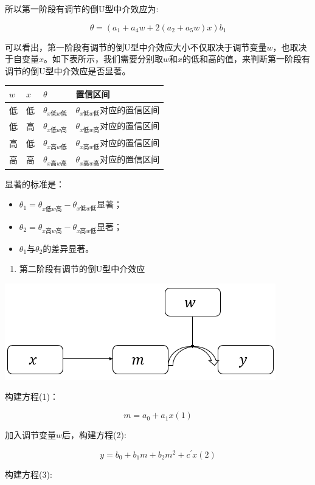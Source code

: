 \documentclass[
]{book}
\providecommand{\tightlist}{%
  \setlength{\itemsep}{0pt}\setlength{\parskip}{0pt}}
\begin{document}
所以第一阶段有调节的倒U型中介效应为:

\[
\theta=(a_{1}+a_{4}w+2(a_{2}+a_{5}w)x)b_{1}
\]

可以看出，第一阶段有调节的倒U型中介效应大小不仅取决于调节变量\(w\)，也取决于自变量\(x\)。如下表所示，我们需要分别取\(w\)和\(x\)的低和高的值，来判断第一阶段有调节的倒U型中介效应是否显著。

\begin{longtable}[]{@{}llll@{}}
\toprule
\(w\) & \(x\) & \(\theta\) & 置信区间\tabularnewline
\midrule
\endhead
低 & 低 & \(\theta_{x低w低}\) & \(\theta_{x低w低}\)对应的置信区间\tabularnewline
低 & 高 & \(\theta_{x低w高}\) & \(\theta_{x低w高}\)对应的置信区间\tabularnewline
高 & 低 & \(\theta_{x高w低}\) & \(\theta_{x高w低}\)对应的置信区间\tabularnewline
高 & 高 & \(\theta_{x高w高}\) & \(\theta_{x高w高}\)对应的置信区间\tabularnewline
\bottomrule
\end{longtable}

显著的标准是：

\begin{itemize}
\item
  \(\theta_{1}=\theta_{x低w高}-\theta_{x低w低}\)显著；
\item
  \(\theta_{2}=\theta_{x高w高}-\theta_{x高w低}\)显著；
\item
  \(\theta_{1}\)与\(\theta_{2}\)的差异显著。
\end{itemize}

\begin{enumerate}
\def\labelenumi{\arabic{enumi}.}
\setcounter{enumi}{4}
\tightlist
\item
  第二阶段有调节的倒U型中介效应
\end{enumerate}

\includegraphics{figs/1225.png}

构建方程(1)：

\[
m=a_{0}+a_{1}x(1)
\]

加入调节变量\(w\)后，构建方程(2):

\[
y=b_{0}+b_{1}m+b_{2}m^{2}+c^{'}x(2)
\]

构建方程(3):
\end{document}
